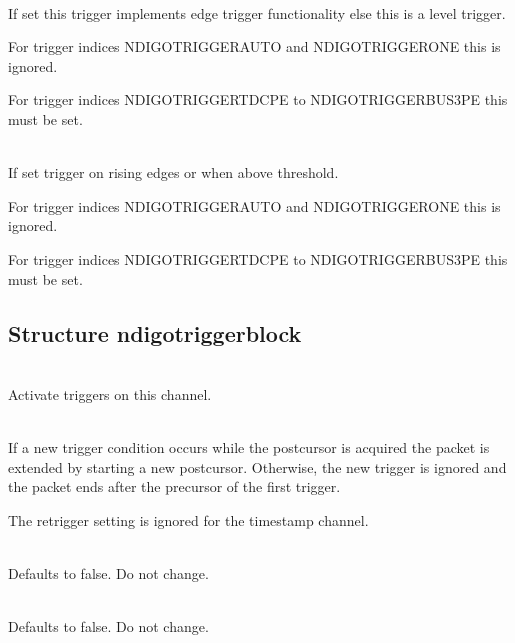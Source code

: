             \\
            If set this trigger implements edge trigger functionality else this is a level trigger.\par

            For trigger indices \textsf{NDIGO\tu TRIGGER\tu AUTO} and \textsf{NDIGO\tu TRIGGER\tu ONE} this is ignored.\par

            For trigger indices \textsf{NDIGO\tu TRIGGER\tu TDC\tu PE} to \textsf{NDIGO\tu TRIGGER\tu BUS3\tu PE} this must be set.\par

            \\
            If set trigger on rising edges or when above threshold.\par

            For trigger indices \textsf{NDIGO\tu TRIGGER\tu AUTO} and \textsf{NDIGO\tu TRIGGER\tu ONE} this is ignored.\par

            For trigger indices \textsf{NDIGO\tu TRIGGER\tu TDC\tu PE} to \textsf{NDIGO\tu TRIGGER\tu BUS3\tu PE} this must be set.

        \subsection{Structure ndigo\tu trigger\tu block\label{cp:triggerblock}}

        \\
        Activate triggers on this channel.\par

        \\
        If a new trigger condition occurs while the postcursor is acquired the packet is extended by starting a new postcursor. Otherwise, the new trigger is ignored and the packet ends after the precursor of the first trigger.\par

        The retrigger setting is ignored for the timestamp channel.\par

        \\
        Defaults to false. Do not change.\par

        \\
        Defaults to false. Do not change.\par

